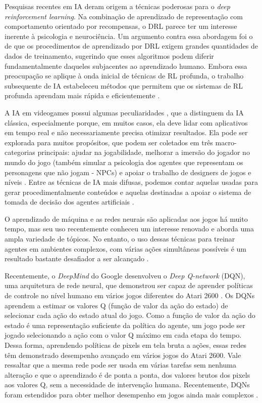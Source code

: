 Pesquisas recentes em IA deram origem a técnicas poderosas para o \textit{deep reinforcement learning}. 
Na combinação de aprendizado de representação com comportamento orientado por recompensas, o DRL parece ter um interesse inerente à psicologia e neurociência. 
Um argumento contra essa abordagem foi o de que os procedimentos de aprendizado por DRL exigem grandes quantidades de dados de treinamento, sugerindo que esses algoritmos podem diferir fundamentalmente daqueles subjacentes ao aprendizado humano. 
Embora essa preocupação se aplique à onda inicial de técnicas de RL profunda, o trabalho subsequente de IA estabeleceu métodos que permitem que os sistemas de RL profunda aprendam mais rápida e eficientemente \cite{Botvinick:rl-fastandslow:2019}.

A IA em videogames possui algumas peculiaridades \cite{Yannakakis:2012:GAR:2212908.2212954, Millington:2009:AIG:1795711}, que a distinguem da IA clássica, especialmente porque, em muitos casos, ela deve lidar com aplicativos em tempo real e não necessariamente precisa otimizar resultados. Ela pode ser explorada para muitos propósitos, que podem ser coletados em três macro-categorias principais: ajudar na jogabilidade, melhorar a imersão do jogador no mundo do jogo (também simular a psicologia dos agentes que representam os personagens que não jogam - NPCs) e apoiar o trabalho de designers de jogos e níveis \cite{Piergigli:drl:2019}. 
Entre as técnicas de IA mais difusas, podemos contar aquelas usadas para gerar procedimentalmente conteúdos \cite{Karavolos:automated-level-design:2018,Ripamonti2017} e aquelas destinadas a apoiar o sistema de tomada de decisão dos agentes artificiais \cite{Ripamonti:Believable-group-behaviours:2017}.

O aprendizado de máquina e as redes neurais são aplicadas aos jogos há muito tempo, mas seu uso recentemente conheceu um interesse renovado e aborda uma ampla variedade de tópicos.
No entanto, o uso dessas técnicas para treinar agentes em ambientes complexos, com várias ações simultâneas possíveis é um resultado bastante desafiador a ser alcançado \cite{Piergigli:drl:2019}.

Recentemente, o \textit{DeepMind} do Google desenvolveu o \textit{Deep Q-network} (DQN), uma arquitetura de rede neural, que demonstrou ser capaz de aprender políticas de controle no nível humano em vários jogos diferentes do Atari 2600 \cite{mnih-human-control-drl}. Os DQNs aprendem a estimar os valores Q (função de valor da ação do estado) de selecionar cada ação do estado atual do jogo. Como a função de valor da ação do estado é uma representação suficiente da política do agente, um jogo pode ser jogado selecionando a ação com o valor Q máximo em cada etapa do tempo. Dessa forma, aprendendo políticas de pixels em tela bruta a ações, essas redes têm demonstrado desempenho avançado em vários jogos do Atari 2600. Vale ressaltar que a mesma rede pode ser usada em várias tarefas sem nenhuma alteração e que o aprendizado é de ponta a ponta, dos valores brutos dos pixels aos valores Q, sem a necessidade de intervenção humana. Recentemente, DQNs foram estendidos para obter melhor desempenho em jogos ainda mais complexos \cite{Debidatta:playing-games-drl:2016}.




